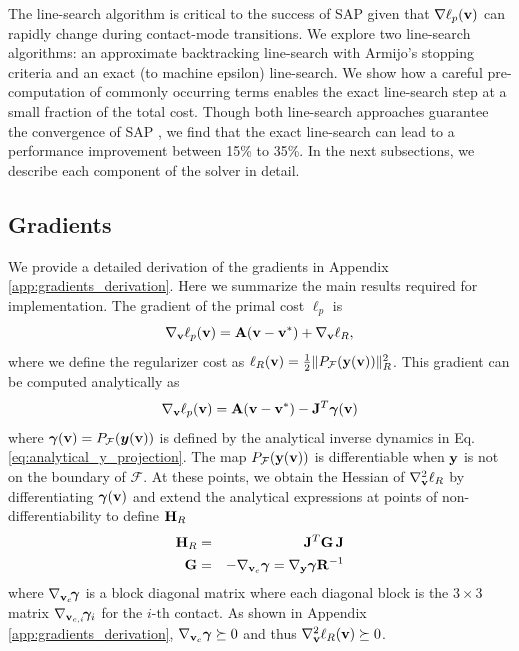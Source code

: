 The line-search algorithm is critical to the success of SAP
given that $\nabla \ell_p({\mathbf{v}})$ can rapidly change during 
contact-mode transitions.  We explore two line-search
algorithms: an approximate backtracking line-search with Armijo's stopping
criteria and an exact (to machine epsilon) line-search. We show how a careful
pre-computation of commonly occurring terms enables the exact line-search step
at a small fraction of the total cost. Though both line-search approaches
guarantee the convergence of SAP , we find
that the exact line-search can lead to a performance improvement between 15\% to
35\%. In the next subsections, we describe each component of the solver in
detail.

\subsection{Gradients}
\label{sec:gradients}

We provide a detailed derivation of the gradients in Appendix
\ref{app:gradients_derivation}. Here we summarize the main results required for
implementation. The gradient of the
primal cost $\ell_p$ is
\begin{equation*}
	\nabla_{\mathbf{v}}\ell_p({\mathbf{v}}) = {\mathbf{A}}({\mathbf{v}}-{\mathbf{v}}^*) + \nabla_{\mathbf{v}}\ell_R,
\end{equation*}
where we define the regularizer cost as $\ell_R({\mathbf{v}})=\frac{1}{2}\Vert
P_\mathcal{F}({\mathbf{y}}({\mathbf{v}}))\Vert_R^2$. This gradient can be computed analytically as
\begin{equation}
	\nabla_\mf{v}\ell_p(\mf{v}) = \mf{A}(\mf{v}-\mf{v}^*) - \mf{J}^T\bgamma(\mf{v})
	\label{eq:primal_gradient}
\end{equation}
where ${\bm\gamma}({\mathbf{v}})=P_\mathcal{F}({\bm{y}}({\mathbf{v}}))$ is defined by the analytical inverse
dynamics in Eq. \eqref{eq:analytical_y_projection}. 
The map $P_\mathcal{F}({\mathbf{y}}({\mathbf{v}}))$ is differentiable
when ${\mathbf{y}}$ is not on the boundary of $\mathcal{F}$. At these points, we
obtain the Hessian of $\nabla_{\mathbf{v}}^2\ell_R$  by differentiating
${\bm\gamma}({\mathbf{v}})$ and extend the analytical expressions at points of non-differentiability to define ${\mathbf{H}}_R$
\begin{eqnarray}
	\mf{H}_R &=& \mf{J}^T\mf{G}\,\mf{J}\nonumber\\
	\mf{G} &=&-\nabla_{\mf{v}_c}\bgamma = \nabla_\mf{y}\bgamma \mf{R}^{-1}
	\label{eq:ellR_hessian}
\end{eqnarray}
where $\nabla_{{\mathbf{v}}_c}\!{\bm\gamma}$ is a block diagonal matrix where each
diagonal block is the $3\times 3$ matrix $\nabla_{{\mathbf{v}}_{c,i}}\!{\bm\gamma}_i$
for the $i\text{-th}$ contact. As shown in Appendix
\ref{app:gradients_derivation}, $\nabla_{{\mathbf{v}}_c}{\bm\gamma}\succeq 0$ and thus
$\nabla_{\mathbf{v}}^2\ell_R({\mathbf{v}})\succeq 0$.

